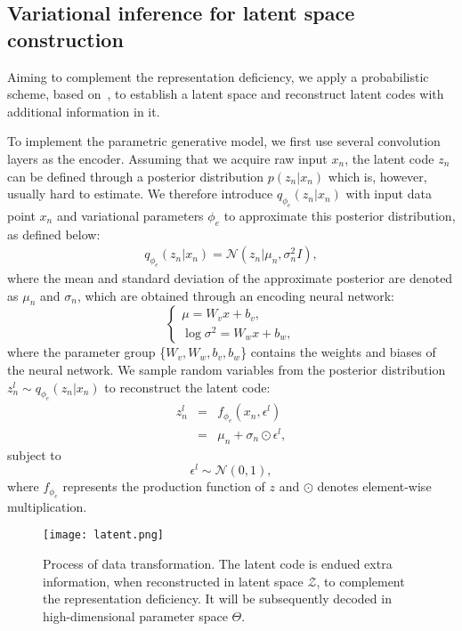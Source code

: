 \documentclass[10pt,conference,a4paper]{IEEEtran}
\begin{document}
\subsection{Variational inference for latent space construction}
Aiming to complement the representation deficiency, we apply a probabilistic scheme, based on~\cite{kingma2014auto-encoding}, to establish a latent space and reconstruct latent codes with additional information in it.

To implement the parametric generative model, we first use several convolution layers as the encoder. Assuming that we acquire raw input $x_{n}$, the latent code $z_{n}$ can be defined through a posterior distribution $p (z_{n}|x_{n})$ which is, however, usually hard to estimate. We therefore introduce $q_{\phi_{e}} (z_{n}|x_{n})$ with input data point $x_{n}$ and variational parameters $\phi_{e}$ to approximate this posterior distribution, as defined below: 
\begin{equation}
\begin{split}
q_{\phi_{e}} (z_{n}|x_{n}) = \mathcal N (z_{n}|\mu_{n}, \sigma_{n}^{2}I), 
\end{split}
\end{equation}
where the mean and standard deviation of the approximate posterior are denoted as $\mu_{n}$ and $\sigma_{n}$, which are obtained through an encoding neural network: 
\begin{equation}
\begin{cases}
\mu = W_{v}x + b_{v},\\
\log \sigma^{2} = W_{w}x + b_{w}, 
\end{cases}
\end{equation}
where the parameter group \{$W_{v}, W_{w}, b_{v}, b_{w}$\} contains the weights and biases of the neural network. We sample random variables from the posterior distribution $z^{l}_{n} \sim q_{\phi_{e}} (z_{n}|x_{n})$ to reconstruct the latent code: 
\begin{eqnarray}
z^{l}_{n}\! & = & \!f_{\phi_{e}} (x_{n}, \epsilon^{l}) \nonumber\\
& = & \!\mu_{n} + \sigma_{n}\odot\epsilon^{l}, 
\end{eqnarray}
subject to 
\[\epsilon^{l} \sim \mathcal N (0, 1), \]
where $f_{\phi_{e}}$ represents the production function of $z$ and $\odot$ denotes element-wise multiplication.

\begin{figure}[tbp]
	\centerline{\texttt{[image: latent.png]}}
	\caption{Process of data transformation. The latent code is endued extra information, when reconstructed in latent space $\mathcal{Z}$, to complement the representation deficiency. It will be subsequently decoded in high-dimensional parameter space $\Theta$.}
	\label{latent}
\end{figure}
\end{document}
